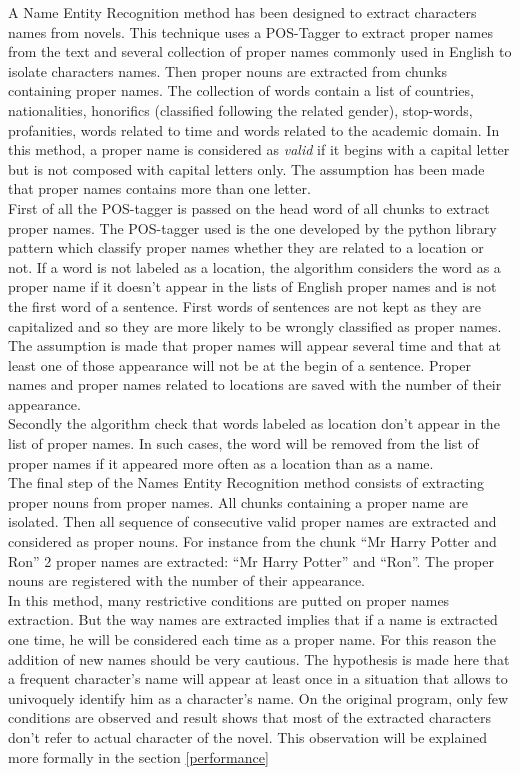\documentclass[a4paper, 12pt]{report}
\begin{document}
A Name Entity Recognition method has been designed to extract characters names from novels. This technique uses a POS-Tagger to extract proper names from the text and several collection of proper names commonly used in English to isolate characters names. Then proper nouns are extracted from chunks containing proper names. The collection of words contain a list of countries, nationalities, honorifics (classified following the related gender), stop-words, profanities, words related to time and words related to the academic domain. In this method, a  proper name is considered as \textit{valid} if it begins with a capital letter but is not composed with capital letters only. The assumption has been made that proper names contains more than one letter.\\
First of all the POS-tagger is passed on the head word of all chunks to extract  proper names. The POS-tagger used is the one developed by the python library pattern which classify  proper names whether they are related to a location or not. If a word is not labeled as a location, the algorithm considers the word as a proper name if it doesn't appear in the lists of English  proper names and is not the first word of a sentence. First words of sentences are not kept as they are capitalized and so they are more likely to be wrongly classified as proper names. The assumption is made that proper names will appear several time and that at least one of those appearance will not be at the begin of a sentence. Proper names and  proper names related to locations are saved with the number of their appearance.\\
Secondly the algorithm check that words labeled as location don't appear in the list of proper names. In such cases, the word will be removed from the list of proper names if it appeared more often as a location than as a name.\\
The final step of the Names Entity Recognition method consists of extracting proper nouns from proper names. All chunks containing a proper name are isolated.   Then all sequence of consecutive valid  proper names are extracted and considered as proper nouns. For instance from the chunk ``Mr Harry Potter and Ron'' 2 proper names are extracted: ``Mr Harry Potter'' and ``Ron''. The proper nouns are registered with the number of their appearance.\\

In this method, many restrictive conditions are putted on proper names extraction. But the way names are extracted implies that if a name is extracted one time, he will be considered each time as a proper name. For this reason the addition of new names should be very cautious. The hypothesis is made here that a frequent character's name will appear at least once in a situation that allows to univoquely identify him as a character's name. On the original program, only few conditions are observed and result shows that most of the extracted characters don't refer to actual character of the novel. This observation will be explained more formally in the section \ref{performance}
\end{document}

